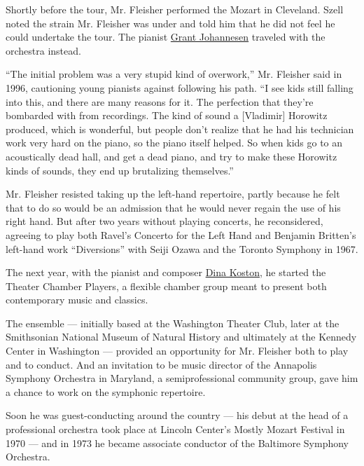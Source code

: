 Shortly before the tour, Mr. Fleisher performed the Mozart in Cleveland.
Szell noted the strain Mr. Fleisher was under and told him that he did
not feel he could undertake the tour. The pianist
\href{https://www.nytimes.com/2005/03/30/arts/music/grant-johannesen-unorthodox-pianist-is-dead-at-83.html\#:~:text=Grant\%20Johannesen\%2C\%20a\%20pianist\%20best,David\%20Johannesen\%2C\%20announced\%20the\%20death.}{Grant
Johannesen} traveled with the orchestra instead.

``The initial problem was a very stupid kind of overwork,'' Mr. Fleisher
said in 1996, cautioning young pianists against following his path. ``I
see kids still falling into this, and there are many reasons for it. The
perfection that they're bombarded with from recordings. The kind of
sound a {[}Vladimir{]} Horowitz produced, which is wonderful, but people
don't realize that he had his technician work very hard on the piano, so
the piano itself helped. So when kids go to an acoustically dead hall,
and get a dead piano, and try to make these Horowitz kinds of sounds,
they end up brutalizing themselves.''

Mr. Fleisher resisted taking up the left-hand repertoire, partly because
he felt that to do so would be an admission that he would never regain
the use of his right hand. But after two years without playing concerts,
he reconsidered, agreeing to play both Ravel's Concerto for the Left
Hand and Benjamin Britten's left-hand work ``Diversions'' with Seiji
Ozawa and the Toronto Symphony in 1967.

The next year, with the pianist and composer
\href{https://www.rogershapirofund.org/founders/dina-koston/}{Dina
Koston}, he started the Theater Chamber Players, a flexible chamber
group meant to present both contemporary music and classics.

The ensemble --- initially based at the Washington Theater Club, later
at the Smithsonian National Museum of Natural History and ultimately at
the Kennedy Center in Washington --- provided an opportunity for Mr.
Fleisher both to play and to conduct. And an invitation to be music
director of the Annapolis Symphony Orchestra in Maryland, a
semiprofessional community group, gave him a chance to work on the
symphonic repertoire.

Soon he was guest-conducting around the country --- his debut at the
head of a professional orchestra took place at Lincoln Center's Mostly
Mozart Festival in 1970 --- and in 1973 he became associate conductor of
the Baltimore Symphony Orchestra.

